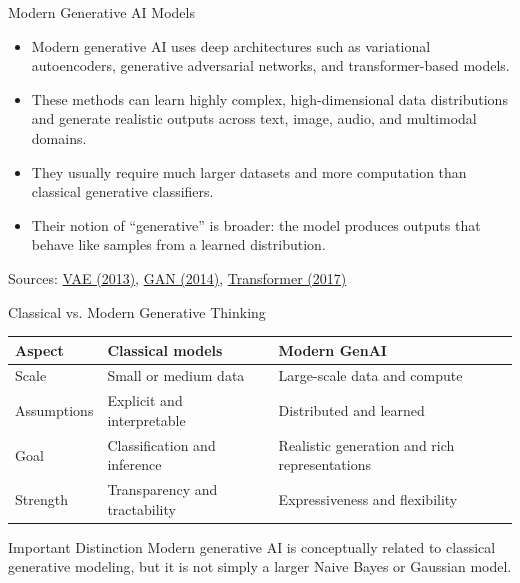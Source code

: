 \documentclass[10pt]{beamer}
\begin{document}
\begin{frame}{Modern Generative AI Models}
  \justifying
  \begin{itemize}
    \item Modern generative AI uses deep architectures such as variational autoencoders, generative adversarial networks, and transformer-based models.
    \item These methods can learn highly complex, high-dimensional data distributions and generate realistic outputs across text, image, audio, and multimodal domains.
    \item They usually require much larger datasets and more computation than classical generative classifiers.
    \item Their notion of ``generative'' is broader: the model produces outputs that behave like samples from a learned distribution.
  \end{itemize}
  \vspace{0.3em}
  {\footnotesize Sources: \href{https://arxiv.org/abs/1312.6114}{VAE (2013)}, \href{https://arxiv.org/abs/1406.2661}{GAN (2014)}, \href{https://arxiv.org/abs/1706.03762}{Transformer (2017)}}
\end{frame}

\begin{frame}{Classical vs. Modern Generative Thinking}
  \justifying
  \begin{table}[ht]
    \centering
    \begin{tabular}{p{}p{}p{}}
      \toprule
      Aspect & Classical models & Modern GenAI \\
      \midrule
      Scale & Small or medium data & Large-scale data and compute \\
      Assumptions & Explicit and interpretable & Distributed and learned \\
      Goal & Classification and inference & Realistic generation and rich representations \\
      Strength & Transparency and tractability & Expressiveness and flexibility \\
      \bottomrule
    \end{tabular}
  \end{table}
  \begin{warningbox}{Important Distinction}
    Modern generative AI is conceptually related to classical generative modeling, but it is not simply a larger Naive Bayes or Gaussian model.
  \end{warningbox}
\end{frame}
\end{document}
